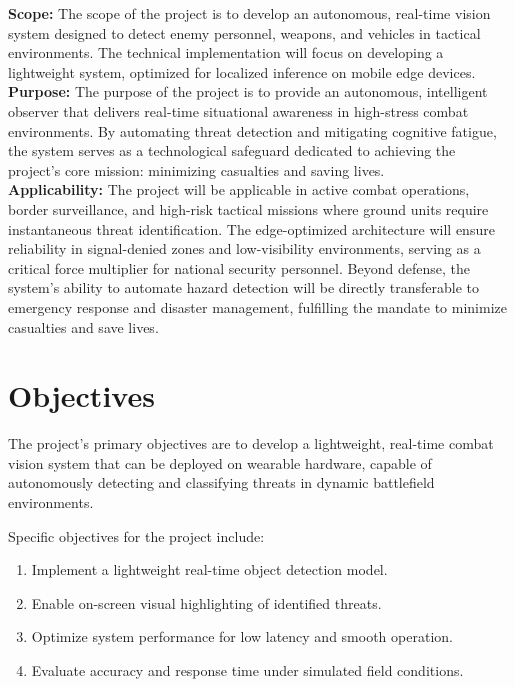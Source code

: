 \textbf{Scope:} The scope of the project is to develop an autonomous, real-time vision system designed to detect enemy personnel, weapons, and vehicles in tactical environments. The technical implementation will focus on developing a lightweight system, optimized for localized inference on mobile edge devices. \\

\textbf{Purpose:} The purpose of the project is to provide an autonomous, intelligent observer that delivers real-time situational awareness in high-stress combat environments. By automating threat detection and mitigating cognitive fatigue, the system serves as a technological safeguard dedicated to achieving the project's core mission: minimizing casualties and saving lives. \\

\textbf{Applicability:} The project will be applicable in active combat operations, border surveillance, and high-risk tactical missions where ground units require instantaneous threat identification. The edge-optimized architecture will ensure reliability in signal-denied zones and low-visibility environments, serving as a critical force multiplier for national security personnel. Beyond defense, the system's ability to automate hazard detection will be directly transferable to emergency response and disaster management, fulfilling the mandate to minimize casualties and save lives.

\section{Objectives}
The project's primary objectives are to develop a lightweight, real-time combat vision system that can be deployed on wearable hardware, capable of autonomously detecting and classifying threats in dynamic battlefield environments. \par

Specific objectives for the project include:
\begin{enumerate}[label=\roman*.]
    \item Implement a lightweight real-time object detection model.
    \item Enable on-screen visual highlighting of identified threats.
    \item Optimize system performance for low latency and smooth operation.
    \item Evaluate accuracy and response time under simulated field conditions.
\end{enumerate}

